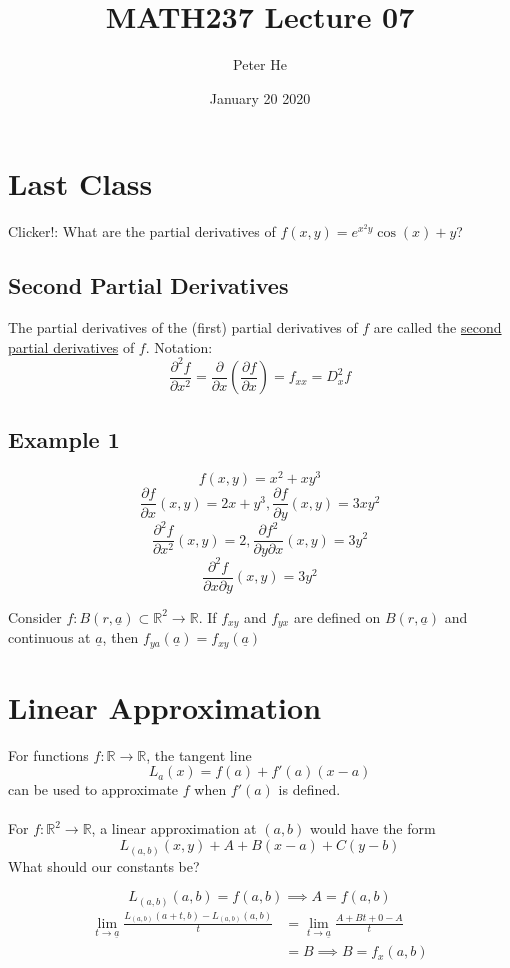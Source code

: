 \documentclass[12pt]{article}
\title{MATH237 Lecture 07}
\author{Peter He}
\date{January 20 2020}
\theoremstyle{definition}
\newcommand{\R}{\mathbb{R}}
\begin{document}
\maketitle

\section{Last Class}
Clicker!: What are the partial derivatives of $f(x,y)=e^{x^2y}\cos(x)+y$?

\subsection{Second Partial Derivatives}
The partial derivatives of the (first) partial derivatives of $f$ are called the \underline{second partial derivatives} of $f$. Notation:
\[\frac{\partial^2f}{\partial x^2}=\frac{\partial}{\partial x}\left(\frac{\partial f}{\partial x}\right)=f_{xx}=D^2_xf\]

\subsection{Example 1}
\[f(x,y)=x^2+xy^3\]
\[\frac{\partial f}{\partial x}(x,y)=2x+y^3, \frac{\partial f}{\partial y}(x,y)=3xy^2\]
\[\frac{\partial^2f}{\partial x^2}(x,y)=2, \frac{\partial f^2}{\partial y\partial x}(x,y)=3y^2\]
\[\frac{\partial^2f}{\partial x\partial y}(x,y)=3y^2\]

Consider $f:B(r,\underline a)\subset \R^2\to \R$. If $f_{xy}$ and $f_{yx}$ are defined on $B(r,\underline a)$ and continuous at $\underline a$, then $f_{ya}(\underline a)=f_{xy}(\underline a)$

\section{Linear Approximation}
For functions $f:\R\to \R$, the tangent line \[L_a(x)=f(a)+f'(a)(x-a)\] can be used to approximate $f$ when $f'(a)$ is defined.\\\\
For $f:\R^2\to \R$, a linear approximation at $(a,b)$ would have the form \[L_{(a,b)}(x,y)+A+B(x-a)+C(y-b)\]
What should our constants be?

\[L_{(a,b)}(a,b)=f(a,b)\implies A=f(a,b)\]
\begin{align*}
    \lim_{t\to\underline a}\frac{L_{(a,b)}(a+t, b)-L_{(a,b)}(a,b)}{t}&=\lim_{t\to \underline a}\frac{A+Bt+0-A}{t}\\
    &= B\implies B=f_x(a,b)
\end{align*}
\end{document}

